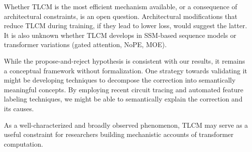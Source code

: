 Whether TLCM is the most efficient mechanism available, or a consequence of architectural constraints, is an open question. Architectural modifications that reduce TLCM during training, if they lead to lower loss, would suggest the latter. It is also unknown whether TLCM develops in SSM-based sequence models or transformer variations (gated attention, NoPE, MOE).

While the propose-and-reject hypothesis is consistent with our results, it remains a conceptual framework without formalization. One strategy towards validating it might be developing techniques to decompose the correction into semantically meaningful concepts. By employing recent circuit tracing and automated feature labeling techniques, we might be able to semantically explain the correction and its causes.

As a well-characterized and broadly observed phenomenon, TLCM may serve as a useful constraint for researchers building mechanistic accounts of transformer computation.

\newpage
